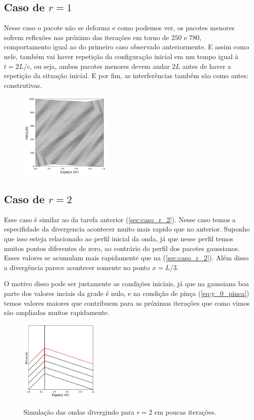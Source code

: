 \documentclass[a4paper, 11pt]{article}
\begin{document}
\subsection{Caso de \( r = 1 \) }
Nesse caso o pacote não se deforma e como podemos ver, os pacotes menores sofrem reflexões
nas próximo das iterações em torno de $250$ e $780$, comportamento igual ao do primeiro caso observado
anteriormente. E assim como nele, também vai haver repetição da configuração inicial em um tempo
igual à \( t = 2L/c \), ou seja, ambos pacotes menores devem andar \( 2L \) antes de haver a
repetição da situação inicial. E por fim, as interferências também são como antes: construtivas.

\begin{figure}[h!] 
    \centering
    \centering
    \includegraphics[width=0.4\textwidth]{graf-tarefa2-a}
    \caption{}
    \label{fig:subA}
\end{figure}


\subsection{Caso de \( r = 2 \) }

Esse caso é similar ao da tarefa anterior (\ref{sec:caso_r_2}). Nesse caso temos a especifidade da
divergencia acontecer muito mais rapido que no anterior. Suponho que isso esteja relacionado ao
perfil inicial da onda, já que nesse perfil temos muitos pontos diferentes de zero, ao contrário do
perfil dos pacotes gaussianos. Esses valores se acumulam mais rapidamente que na
(\ref{sec:caso_r_2}). Além disso a divergência parece acontecer somente no ponto \( x = L/3 \).

O motivo disso pode ser justamente as condições iniciais, já que na gaussiana boa parte dos valores
inciais da grade é nulo, e na condição de pinça (\ref{eq:y_0_pinca}) temos valores maiores que
contribuem para as próximas iterações que como vimos são ampliadas muitos rapidamente.

\begin{figure}[h!] 
    \centering
    \caption{Simulação das ondas divergindo para \( r = 2 \) em poucas iterações.}
    \includegraphics[width=0.35\textwidth]{graf-tarefa2-b}
    \label{fig:subB}
\end{figure}
\end{document}
